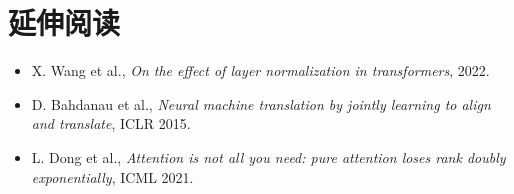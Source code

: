 \section*{延伸阅读}
\begin{itemize}[leftmargin=2em,itemsep=2pt]
  \item X. Wang et al., \emph{On the effect of layer normalization in transformers}, 2022.
  \item D. Bahdanau et al., \emph{Neural machine translation by jointly learning to align and translate}, ICLR 2015.
  \item L. Dong et al., \emph{Attention is not all you need: pure attention loses rank doubly exponentially}, ICML 2021.
\end{itemize}
